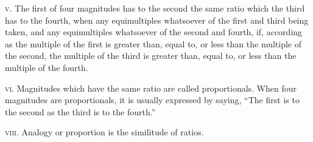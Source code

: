 \documentclass[oneside]{book}
\begin{document}
\textsc{v.} The first of four magnitudes has to the second
the same ratio which the third has to the fourth, when
any equimultiples whatsoever of the first and third
being taken, and any equimultiples whatsoever of the
second and fourth, if, according as the multiple of the
first is greater than, equal to, or less than the multiple
of the second, the multiple of the third is greater than,
equal to, or less than the multiple of the fourth.

\textsc{vi.} Magnitudes which have the same ratio are called
proportionals. When four magnitudes are proportionals,
it is usually expressed by saying, ``The first is to
the second as the third is to the fourth.''

\textsc{viii.} Analogy or proportion is the similitude of
ratios.\par\smallskip
\end{document}
